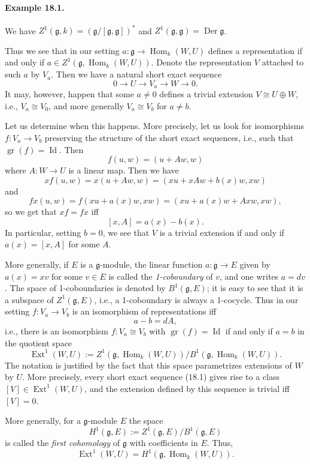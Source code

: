 \documentclass[UTF8,11pt]{ctexart}
\newcommand{\Hom}{\operatorname{Hom}}
\begin{document}
\paragraph{Example 18.1.}
We have $Z^1(\mathfrak g,k)=(\mathfrak g/[\mathfrak g,\mathfrak g])^*$ and $Z^1(\mathfrak g,\mathfrak g)=\operatorname{Der}\mathfrak g$.

Thus we see that in our setting $a:\mathfrak g\to\Hom_k(W,U)$ defines a representation if and only if $a\in Z^1(\mathfrak g,\Hom_k(W,U))$. Denote the representation $V$ attached to such $a$ by $V_a$. Then we have a natural short exact sequence
\[
0\to U\to V_a\to W\to0.
\]
It may, however, happen that some $a\ne0$ defines a trivial extension $V\cong U\oplus W$, i.e., $V_a\cong V_0$, and more generally $V_a\cong V_b$ for $a\ne b$.

Let us determine when this happens. More precisely, let us look for isomorphisms $f:V_a\to V_b$ preserving the structure of the short exact sequences, i.e., such that $\operatorname{gr}(f)=\operatorname{Id}$. Then
\[
f(u,w)=(u+Aw,w)
\]
where $A:W\to U$ is a linear map. Then we have
\[
xf(u,w)=x(u+Aw,w)=(xu+xAw+b(x)w,xw)
\]
and
\[
fx(u,w)=f(xu+a(x)w,xw)=(xu+a(x)w+Axw,xw),
\]
so we get that $xf=fx$ iff
\[
[x,A]=a(x)-b(x).
\]
In particular, setting $b=0$, we see that $V$ is a trivial extension if and only if $a(x)=[x,A]$ for some $A$.

More generally, if $E$ is a $\mathfrak g$-module, the linear function $a:\mathfrak g\to E$ given by $a(x)=xv$ for some $v\in E$ is called the \emph{1-coboundary} of $v$, and one writes $a=dv$. The space of 1-coboundaries is denoted by $B^1(\mathfrak g,E)$; it is easy to see that it is a subspace of $Z^1(\mathfrak g,E)$, i.e., a 1-coboundary is always a 1-cocycle. Thus in our setting $f:V_a\to V_b$ is an isomorphism of representations iff
\[
a-b=dA,
\]
i.e., there is an isomorphism $f:V_a\cong V_b$ with $\operatorname{gr}(f)=\operatorname{Id}$ if and only if $a=b$ in the quotient space
\[
\operatorname{Ext}^1(W,U):=Z^1(\mathfrak g,\Hom_k(W,U))/B^1(\mathfrak g,\Hom_k(W,U)).
\]
The notation is justified by the fact that this space parametrizes extensions of $W$ by $U$. More precisely, every short exact sequence (18.1) gives rise to a class $[V]\in\operatorname{Ext}^1(W,U)$, and the extension defined by this sequence is trivial iff $[V]=0$.

More generally, for a $\mathfrak g$-module $E$ the space
\[
H^1(\mathfrak g,E):=Z^1(\mathfrak g,E)/B^1(\mathfrak g,E)
\]
is called the \emph{first cohomology} of $\mathfrak g$ with coefficients in $E$. Thus,
\[
\operatorname{Ext}^1(W,U)=H^1(\mathfrak g,\Hom_k(W,U)).
\]
\end{document}
